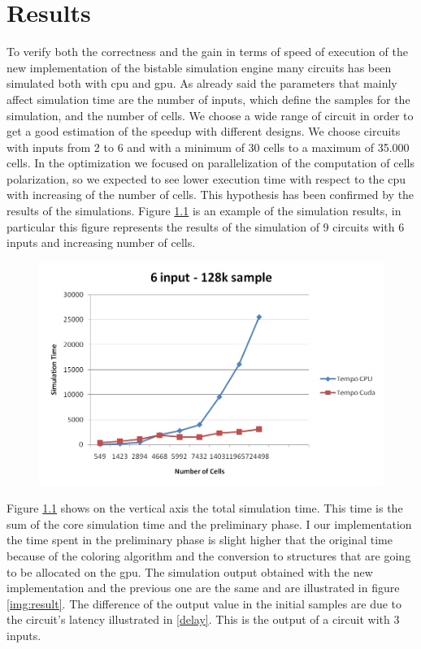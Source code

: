 \chapter{Results}\label{sec:results}
To verify both the correctness and the gain in terms of speed of execution of the new implementation of the bistable simulation engine many circuits has been simulated both with cpu and gpu.
As already said the parameters that mainly affect simulation time are the number of inputs, which define the samples for the simulation, and the number of cells. We choose a wide range of circuit in order to get a good estimation of the speedup with different designs. We choose circuits with inputs from 2 to 6 and with a minimum of 30 cells to a maximum of 35.000 cells. \newline
In the optimization we focused on parallelization of the computation of cells polarization, so we expected to see lower execution time with respect to the cpu with increasing of the number of cells. This hypothesis has been confirmed by the results of the simulations. Figure \ref{img:graph5} is an example of the simulation results, in particular this figure represents the results of the simulation of 9 circuits with 6 inputs and increasing number of cells.

\begin{figure}
\centering
\includegraphics[scale=0.6]{img/graph5.png}
\label{img:graph5}
\end{figure}

Figure \ref{img:graph5} shows on the vertical axis the total simulation time. This time is the sum of the core simulation time and the preliminary phase. I our implementation the time spent in the preliminary phase is slight higher that the original time because of the coloring algorithm and the conversion to structures that are going to be allocated on the gpu.\newline
The simulation output obtained with the new implementation and the previous one are the same and are illustrated in figure \ref{img:result}. The difference of the output value in the initial samples are due to the circuit's latency illustrated in \ref{delay}. This is the output of a circuit with 3 inputs.

